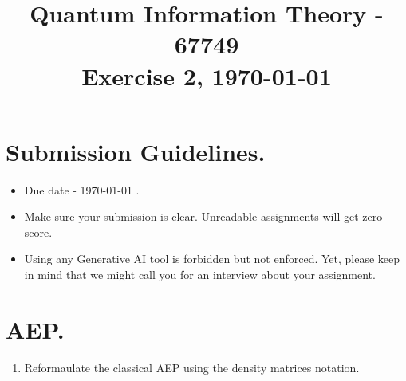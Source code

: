 \documentclass[12pt,a4paper]{article}
\title{ \begin{framed} Quantum Information Theory - 67749 \\ 
Exercise 2, \today \end{framed}  }
\date{\vspace{-5ex}}
\begin{document}
\maketitle{ }    


\newcommand{\CCZ}{\textbf{CCZ}}
\newcommand{\CCX}{\textbf{CCX}}


\setcounter{enumcirc}{1} 


\newcommand{\advanceday}[1][11]{%
\begingroup
\AdvanceDate[#1]%
\today%
\endgroup
}%


\newcommand{\subqCircEx}[2]{\begin{subfigure}[t]{0.5\textwidth}
        \stepcounter{enumcirc} \caption*{ (\alph{enumcirc}) #1} \centering 
        #2
    \end{subfigure}
}

\newcommand{\qCircEx}[4]{\begin{figure*}[h!]
    \centering
    \subqCircEx{#1}{#2}
    ~ 
    \subqCircEx{#3}{#4}
\end{figure*}
}

\newcommand{\qCircExfullline}[2]{\begin{figure*}[h!]
    \stepcounter{enumcirc} \caption*{ (\alph{enumcirc}) #1}
        \centering 
        #2
\end{figure*}
}



\section{Submission Guidelines.}
\begin{itemize}
    \item Due date - \advanceday. 
    \item Make sure your submission is clear. Unreadable assignments will get zero score.  
    \item Using any Generative AI tool is forbidden but not enforced. Yet, please keep in mind that we might call you for an interview about your assignment. 
\end{itemize}

\newpage

\section{AEP.}
\begin{enumerate}
  \item Reformaulate the classical AEP using the density matrices notation. 
\end{enumerate}
\end{document}
